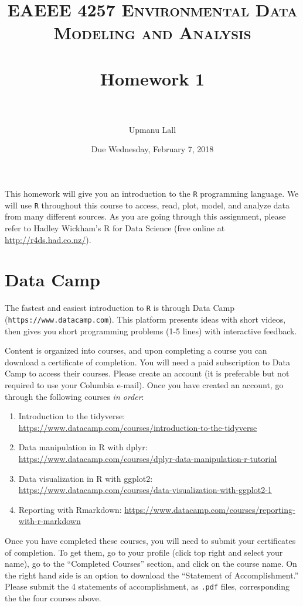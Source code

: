 \documentclass[paper=letter, fontsize=11pt]{scrartcl}
\title{
\normalfont \normalsize
\textsc{EAEEE 4257 Environmental Data Modeling and Analysis} \\ [25pt] %
\horrule{0.5pt} \\[0.4cm] %
\huge Homework 1 \\ %
\horrule{2pt} \\[0.5cm] %
}
\author{Upmanu Lall} %
\date{\normalsize Due Wednesday, February 7, 2018}
\numberwithin{equation}{section}
\numberwithin{figure}{section}
\numberwithin{table}{section}
\begin{document}
\maketitle


This homework will give you an introduction to the \texttt{R} programming language.
We will use \texttt{R} throughout this course to access, read, plot, model, and analyze data from many different sources.
As you are going through this assignment, please refer to Hadley Wickham's R for Data Science (free online at \url{http://r4ds.had.co.nz/}).

\section{Data Camp}

The fastest and easiest introduction to \texttt{R} is through Data Camp (\texttt{https://www.datacamp.com}).
This platform presents ideas with short videos, then gives you short programming problems (1-5 lines) with interactive feedback.

Content is organized into courses, and upon completing a course you can download a certificate of completion.
You will need a paid subscription to Data Camp to access their courses.
Please create an account (it is preferable but not required to use your Columbia e-mail).
Once you have created an account, go through the following courses \emph{in order}:
\begin{enumerate}
  \item Introduction to the tidyverse: \url{https://www.datacamp.com/courses/introduction-to-the-tidyverse}
  \item Data manipulation in R with dplyr: \url{https://www.datacamp.com/courses/dplyr-data-manipulation-r-tutorial}
  \item  Data visualization in R with ggplot2: \url{https://www.datacamp.com/courses/data-visualization-with-ggplot2-1}
  \item Reporting with Rmarkdown: \url{https://www.datacamp.com/courses/reporting-with-r-markdown}
\end{enumerate}
Once you have completed these courses, you will need to submit your certificates of completion.
To get them, go to your profile (click top right and select your name), go to the ``Completed Courses'' section, and click on the course name.
On the right hand side is an option to download the ``Statement of Accomplishment.''
Please submit the 4 statements of accomplishment, as \texttt{.pdf} files, corresponding the the four courses above.
\end{document}

